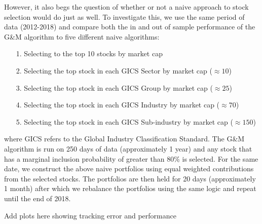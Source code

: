 \documentclass[a4paper, 12pt]{article}
\theoremstyle{plain}
\theoremstyle{definition}
\theoremstyle{remark}
\begin{document}
However, it also begs the question of whether or not a naive approach to stock selection would do just as well. To investigate this, we use the same period of data (2012-2018) and compare both the in and out of sample performance of the G\&M algorithm to five different naive algorithms:
\begin{itemize}
	\item[1.] Selecting to the top 10 stocks by market cap
	\item[2.] Selecting the top stock in each GICS Sector by market cap ($\approx 10$)
	\item[3.] Selecting the top stock in each GICS Group by market cap ($\approx 25$)
	\item[4.] Selecting the top stock in each GICS Industry by market cap ($\approx 70$)
	\item[5.] Selecting the top stock in each GICS Sub-industry by market cap ($\approx 150$)
\end{itemize}
where GICS refers to the Global Industry Classification Standard. The G\&M algorithm is run on 250 days of data (approximately 1 year) and any stock that has a marginal inclusion probability of greater than 80\% is selected. For the same date, we construct the above naive portfolios using equal weighted contributions from the selected stocks. The portfolios are then held for 20 days (approximately 1 month) after which we rebalance the portfolios using the same logic and repeat until the end of 2018.

{\color{red} Add plots here showing tracking error and performance}
\end{document}
